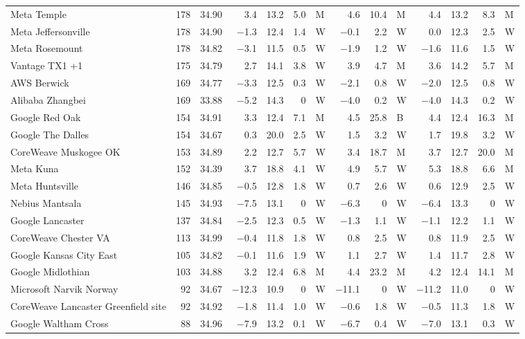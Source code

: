{\begin{longtable}{@{}lrrrrrlrrlrrrl@{}}
Meta Temple & 178 & 34.90 & 3.4 & 13.2 & 5.0 & M & 4.6 & 10.4 & M & 4.4 & 13.2 & 8.3 & M \\
Meta Jeffersonville & 178 & 34.90 & $-$1.3 & 12.4 & 1.4 & W & $-$0.1 & 2.2 & W & 0.0 & 12.3 & 2.5 & W \\
Meta Rosemount & 178 & 34.82 & $-$3.1 & 11.5 & 0.5 & W & $-$1.9 & 1.2 & W & $-$1.6 & 11.6 & 1.5 & W \\
Vantage TX1 +1 & 175 & 34.79 & 2.7 & 14.1 & 3.8 & W & 3.9 & 4.7 & M & 3.6 & 14.2 & 5.7 & M \\
AWS Berwick & 169 & 34.77 & $-$3.3 & 12.5 & 0.3 & W & $-$2.1 & 0.8 & W & $-$2.0 & 12.5 & 0.8 & W \\
Alibaba Zhangbei & 169 & 33.88 & $-$5.2 & 14.3 & 0 & W & $-$4.0 & 0.2 & W & $-$4.0 & 14.3 & 0.2 & W \\
Google Red Oak & 154 & 34.91 & 3.3 & 12.4 & 7.1 & M & 4.5 & 25.8 & B & 4.4 & 12.4 & 16.3 & M \\
Google The Dalles & 154 & 34.67 & 0.3 & 20.0 & 2.5 & W & 1.5 & 3.2 & W & 1.7 & 19.8 & 3.2 & W \\
CoreWeave Muskogee OK & 153 & 34.89 & 2.2 & 12.7 & 5.7 & W & 3.4 & 18.7 & M & 3.7 & 12.7 & 20.0 & M \\
Meta Kuna & 152 & 34.39 & 3.7 & 18.8 & 4.1 & W & 4.9 & 5.7 & W & 5.3 & 18.8 & 6.6 & M \\
Meta Huntsville & 146 & 34.85 & $-$0.5 & 12.8 & 1.8 & W & 0.7 & 2.6 & W & 0.6 & 12.9 & 2.5 & W \\
Nebius Mantsala & 145 & 34.93 & $-$7.5 & 13.1 & 0 & W & $-$6.3 & 0 & W & $-$6.4 & 13.3 & 0 & W \\
Google Lancaster & 137 & 34.84 & $-$2.5 & 12.3 & 0.5 & W & $-$1.3 & 1.1 & W & $-$1.1 & 12.2 & 1.1 & W \\
CoreWeave Chester VA & 113 & 34.99 & $-$0.4 & 11.8 & 1.8 & W & 0.8 & 2.5 & W & 0.8 & 11.9 & 2.5 & W \\
Google Kansas City East & 105 & 34.82 & $-$0.1 & 11.6 & 1.9 & W & 1.1 & 2.7 & W & 1.4 & 11.7 & 2.8 & W \\
Google Midlothian & 103 & 34.88 & 3.2 & 12.4 & 6.8 & M & 4.4 & 23.2 & M & 4.2 & 12.4 & 14.1 & M \\
Microsoft Narvik Norway & 92 & 34.67 & $-$12.3 & 10.9 & 0 & W & $-$11.1 & 0 & W & $-$11.2 & 11.0 & 0 & W \\
CoreWeave Lancaster Greenfield site & 92 & 34.92 & $-$1.8 & 11.4 & 1.0 & W & $-$0.6 & 1.8 & W & $-$0.5 & 11.3 & 1.8 & W \\
Google Waltham Cross & 88 & 34.96 & $-$7.9 & 13.2 & 0.1 & W & $-$6.7 & 0.4 & W & $-$7.0 & 13.1 & 0.3 & W \\

\end{longtable}}
